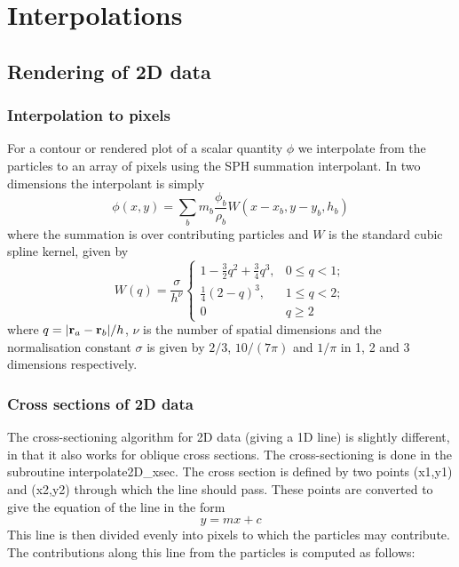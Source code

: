 \documentclass[a4paper,11pt]{article}
\begin{document}
\section{Interpolations}

\subsection{Rendering of 2D data}
\subsubsection{Interpolation to pixels}
 For a contour or rendered plot of a scalar quantity $\phi$ we
interpolate from the particles to an array of pixels using the SPH summation
interpolant. In two dimensions the interpolant is simply
\begin{equation}
\phi(x,y) = \sum_b m_b \frac{\phi_b}{\rho_b} W(x - x_b, y-y_b, h_b)
\end{equation}
where the summation is over contributing particles and $W$ is the standard cubic spline kernel, given by
\begin{equation}
W(q) = \frac{\sigma}{h^\nu}\left\{ \begin{array}{ll}
1 - \frac{3}{2}q^2 + \frac{3}{4}q^3, & 0 \le q < 1; \\
\frac{1}{4}(2-q)^3, & 1 \le q < 2; \\
0 & q \ge 2 \end{array} \right.
\end{equation}
where $q = \vert {\bf r}_a - {\bf r}_b \vert / h$, $\nu$ is the number of spatial
dimensions and the normalisation constant $\sigma$ is given by $2/3$, $10/(7\pi)$ and $1/\pi$ in
1, 2 and 3 dimensions respectively.

\subsubsection{Cross sections of 2D data}
The cross-sectioning algorithm for 2D data (giving a 1D line) is slightly
different, in that it also works for oblique cross sections. The
cross-sectioning is done in the subroutine interpolate2D\_xsec. The cross
section is defined by two points (x1,y1) and (x2,y2) through which the line
should pass. These points are converted to give the equation of the line in the
form
\begin{equation}
y = mx + c
\end{equation}
This line is then divided evenly into pixels to which the particles
may contribute. The contributions along this line from the particles is computed
as follows: 
\end{document}
